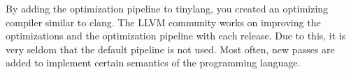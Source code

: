 By adding the optimization pipeline to tinylang, you created an optimizing compiler similar to clang. The LLVM community works on improving the optimizations and the optimization pipeline with each release. Due to this, it is very seldom that the default pipeline is not used. Most often, new passes are added to implement certain semantics of the programming language.





































